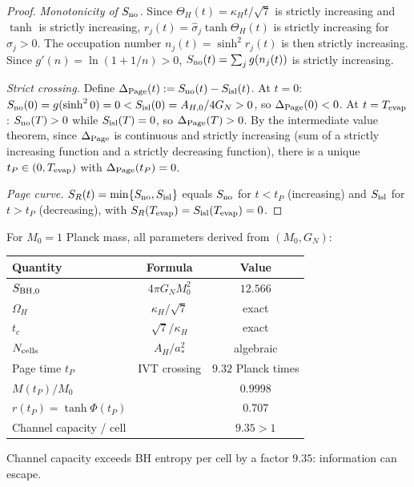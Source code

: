 \documentclass[12pt]{article}
\theoremstyle{plain}
\theoremstyle{definition}
\numberwithin{equation}{section}
\begin{document}
\begin{proof}
\emph{Monotonicity of $S_{\rm no}$.}  Since $\Theta_H(t)=\kappa_H t/\sqrt{7}$ is strictly increasing and $\tanh$ is strictly increasing, $r_j(t)=\hat{\sigma}_j\tanh\Theta_H(t)$ is strictly increasing for $\hat{\sigma}_j>0$.  The occupation number $n_j(t)=\sinh^2 r_j(t)$ is then strictly increasing.  Since $g'(n)=\ln(1+1/n)>0$, $S_{\rm no}(t)=\sum_j g(n_j(t))$ is strictly increasing.

\emph{Strict crossing.}  Define $\Delta_{\rm Page}(t):=S_{\rm no}(t)-S_{\rm isl}(t)$.  At $t=0$: $S_{\rm no}(0)=g(\sinh^2 0)=0<S_{\rm isl}(0)=A_{H,0}/4G_N>0$, so $\Delta_{\rm Page}(0)<0$.  At $t=T_{\rm evap}$: $S_{\rm no}(T)>0$ while $S_{\rm isl}(T)=0$, so $\Delta_{\rm Page}(T)>0$.  By the intermediate value theorem, since $\Delta_{\rm Page}$ is continuous and strictly increasing (sum of a strictly increasing function and a strictly decreasing function), there is a unique $t_P\in(0,T_{\rm evap})$ with $\Delta_{\rm Page}(t_P)=0$.

\emph{Page curve.}  $S_R(t)=\min\{S_{\rm no},S_{\rm isl}\}$ equals $S_{\rm no}$ for $t<t_P$ (increasing) and $S_{\rm isl}$ for $t>t_P$ (decreasing), with $S_R(T_{\rm evap})=S_{\rm isl}(T_{\rm evap})=0$.
\end{proof}

For $M_0 = 1$ Planck mass, all parameters derived from $(M_0, G_N)$:

\begin{center}
\begin{tabular}{lcc}
\toprule
Quantity & Formula & Value\\
\midrule
$S_{\rm BH,0}$ & $4\pi G_N M_0^2$ & $12.566$\\
$\Omega_H$ & $\kappa_H/\sqrt{7}$ & exact\\
$t_c$ & $\sqrt{7}/\kappa_H$ & exact\\
$N_{\rm cells}$ & $A_H/a_*^2$ & algebraic\\
Page time $t_P$ & IVT crossing & $9.32$ Planck times\\
$M(t_P)/M_0$ & & $0.9998$\\
$r(t_P) = \tanh\Phi(t_P)$ & & $0.707$\\
Channel capacity / cell & & $9.35 > 1$\\
\bottomrule
\end{tabular}
\end{center}

Channel capacity exceeds BH entropy per cell by a factor $9.35$: information can escape.
\end{document}
